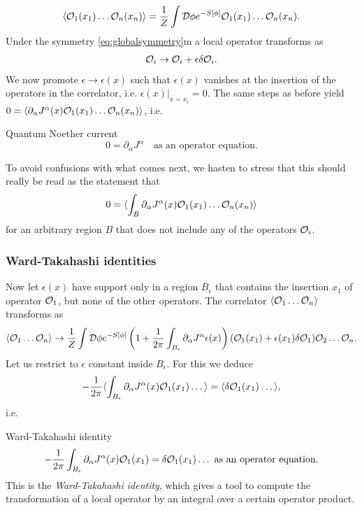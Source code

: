  \begin{equation}
 \langle \mathcal{O}_1(x_1) \dots \mathcal{O}_n(x_n) \rangle = \frac{1}{Z} \int \mathcal{D} \phi e^{-S[\phi]} \mathcal{O}_1 (x_1) \dots \mathcal{O}_n(x_n).
 \end{equation}
 Under the symmetry \ref{eq:globalsymmetry}m a local operator transforms as
 \begin{equation}
 \mathcal{O}_i \rightarrow \mathcal{O}_i + \epsilon \delta \mathcal{O}_i.
 \end{equation}
 We now promote $\epsilon \rightarrow \epsilon(x)$ such that $\epsilon(x)$ vanishes at the insertion of the operators in the correlator, i.e. $\epsilon(x) |_{x=x_i} =0$.
 The same steps as before yield $0=\langle \partial_\alpha J^\alpha(x) \mathcal{O}_1(x_1) \dots \mathcal{O}_n(x_n) \rangle$, i.e.
 \begin{mybox}{Quantum Noether current}
 	\begin{equation} 
 	0 = \partial_\alpha J^\alpha \quad \text{as an operator equation}.
 	\end{equation}
 \end{mybox}
 To avoid confusions with what comes next, we hasten to stress that this should really be read as the statement that 
 \begin{equation*}
 	0 = \langle \int_B \partial_\alpha J^\alpha(x) \mathcal{O}_1 (x_1) \dots \mathcal{O}_n(x_n) \rangle 
 \end{equation*}
 for an arbitrary region $B$ that does not include any of the operators $\mathcal{O}_i$.
 
\subsubsection{Ward-Takahashi identities}
Now let $\epsilon(x)$ have support only in a region $B_\epsilon$ that contains the insertion $x_1$ of operator $\mathcal{O}_1$, but none of the other operators.
The correlator $\langle \mathcal{O}_1 \dots \mathcal{O}_n\rangle$ transforms as
\begin{equation}
\langle \mathcal{O}_1 \dots \mathcal{O}_n \rangle \rightarrow \frac{1}{Z} \int \mathcal{D} \phi e^{-S[\phi]} \left(1+\frac{1}{2\pi} \int_{B_\epsilon } \partial_\alpha J^\alpha \epsilon(x) \right) (\mathcal{O}_1(x_1) +\epsilon(x_1) \delta \mathcal{O}_1) \mathcal{O}_2 \dots \mathcal{O}_n.
\end{equation}
Let us restrict to $\epsilon$ constant inside $B_\epsilon$. For this we deduce
\begin{equation}
-\frac{1}{2\pi} \langle \int_{B_\epsilon} \partial_\alpha J^\alpha(x) \mathcal{O}_1(x_1) \dots \rangle = \langle \delta\mathcal{O}_1(x_1) \dots \rangle,
\end{equation}
i.e.
\begin{mybox}{Ward-Takahashi identity}
	\begin{equation}
	-\frac{1}{2\pi} \int_{B_\epsilon} \partial_\alpha J^\alpha(x) \mathcal{O}_1(x_1) = \delta \mathcal{O}_1(x_1) \dots \text{  as an operator equation.}
	\end{equation}
	This is the \emph{Ward-Takahashi identity}, which gives a tool to compute the transformation of a local operator by an integral over a certain operator product.
\end{mybox} 

